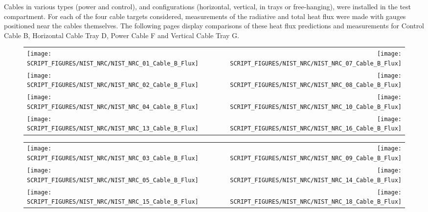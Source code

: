 Cables in various types (power and control), and configurations (horizontal, vertical, in trays or free-hanging), were installed in
the test compartment. For each of the four cable targets considered, measurements of the radiative and total heat flux were made with
gauges positioned near the cables themselves.  The following pages display comparisons of these heat flux predictions and measurements for
Control Cable B, Horizontal Cable Tray D, Power Cable F and Vertical Cable Tray G.

\newpage

\begin{figure}[p]
\begin{tabular*}{\textwidth}{l@{\extracolsep{\fill}}r}
\texttt{[image: SCRIPT\_FIGURES/NIST\_NRC/NIST\_NRC\_01\_Cable\_B\_Flux]} &
\texttt{[image: SCRIPT\_FIGURES/NIST\_NRC/NIST\_NRC\_07\_Cable\_B\_Flux]} \\
\texttt{[image: SCRIPT\_FIGURES/NIST\_NRC/NIST\_NRC\_02\_Cable\_B\_Flux]} &
\texttt{[image: SCRIPT\_FIGURES/NIST\_NRC/NIST\_NRC\_08\_Cable\_B\_Flux]} \\
\texttt{[image: SCRIPT\_FIGURES/NIST\_NRC/NIST\_NRC\_04\_Cable\_B\_Flux]} &
\texttt{[image: SCRIPT\_FIGURES/NIST\_NRC/NIST\_NRC\_10\_Cable\_B\_Flux]} \\
\texttt{[image: SCRIPT\_FIGURES/NIST\_NRC/NIST\_NRC\_13\_Cable\_B\_Flux]} &
\texttt{[image: SCRIPT\_FIGURES/NIST\_NRC/NIST\_NRC\_16\_Cable\_B\_Flux]}
\end{tabular*}
\label{NIST_NRC_Cable_B_Flux_Closed}
\end{figure}

\begin{figure}[p]
\begin{tabular*}{\textwidth}{l@{\extracolsep{\fill}}r}
\texttt{[image: SCRIPT\_FIGURES/NIST\_NRC/NIST\_NRC\_03\_Cable\_B\_Flux]} &
\texttt{[image: SCRIPT\_FIGURES/NIST\_NRC/NIST\_NRC\_09\_Cable\_B\_Flux]} \\
\texttt{[image: SCRIPT\_FIGURES/NIST\_NRC/NIST\_NRC\_05\_Cable\_B\_Flux]} &
\texttt{[image: SCRIPT\_FIGURES/NIST\_NRC/NIST\_NRC\_14\_Cable\_B\_Flux]} \\
\texttt{[image: SCRIPT\_FIGURES/NIST\_NRC/NIST\_NRC\_15\_Cable\_B\_Flux]} &
\texttt{[image: SCRIPT\_FIGURES/NIST\_NRC/NIST\_NRC\_18\_Cable\_B\_Flux]}
\end{tabular*}
\label{NIST_NRC_Cable_B_Flux_Open}
\end{figure}

